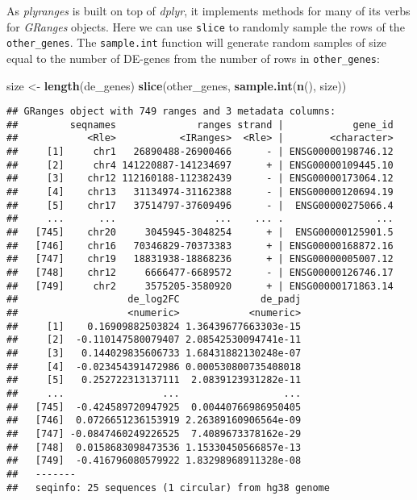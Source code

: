 \documentclass[
]{article}
\newenvironment{Shaded}{}{}
\newcommand{\KeywordTok}[1]{\textcolor[rgb]{0.00,0.44,0.13}{\textbf{#1}}}
\newcommand{\NormalTok}[1]{#1}
\newcommand{\StringTok}[1]{\textcolor[rgb]{0.25,0.44,0.63}{#1}}
\begin{document}
As \emph{plyranges} is built on top of \emph{dplyr}, it implements methods for many of
its verbs for \emph{GRanges} objects. Here we can use \texttt{slice} to randomly sample the
rows of the \texttt{other\_genes}. The \texttt{sample.int} function will generate random
samples of size equal to the number of DE-genes from the number of rows in
\texttt{other\_genes}:

\begin{Shaded}
\begin{Highlighting}[]
\NormalTok{size <-}\StringTok{ }\KeywordTok{length}\NormalTok{(de_genes)}
\KeywordTok{slice}\NormalTok{(other_genes, }\KeywordTok{sample.int}\NormalTok{(}\KeywordTok{n}\NormalTok{(), size))}
\end{Highlighting}
\end{Shaded}

\begin{verbatim}
## GRanges object with 749 ranges and 3 metadata columns:
##         seqnames              ranges strand |            gene_id
##            <Rle>           <IRanges>  <Rle> |        <character>
##     [1]     chr1   26890488-26900466      - | ENSG00000198746.12
##     [2]     chr4 141220887-141234697      + | ENSG00000109445.10
##     [3]    chr12 112160188-112382439      - | ENSG00000173064.12
##     [4]    chr13   31134974-31162388      - | ENSG00000120694.19
##     [5]    chr17   37514797-37609496      - |  ENSG00000275066.4
##     ...      ...                 ...    ... .                ...
##   [745]    chr20     3045945-3048254      + |  ENSG00000125901.5
##   [746]    chr16   70346829-70373383      + | ENSG00000168872.16
##   [747]    chr19   18831938-18868236      + | ENSG00000005007.12
##   [748]    chr12     6666477-6689572      - | ENSG00000126746.17
##   [749]     chr2     3575205-3580920      + | ENSG00000171863.14
##                   de_log2FC              de_padj
##                   <numeric>            <numeric>
##     [1]    0.16909882503824 1.36439677663303e-15
##     [2]  -0.110147580079407 2.08542530094741e-11
##     [3]   0.144029835606733 1.68431882130248e-07
##     [4]  -0.023454391472986 0.000530800735408018
##     [5]   0.252722313137111  2.0839123931282e-11
##     ...                 ...                  ...
##   [745]  -0.424589720947925  0.00440766986950405
##   [746]  0.0726651236153919 2.26389160906564e-09
##   [747] -0.0847460249226525  7.4089673378162e-29
##   [748]  0.0158683098473536 1.15330450566857e-13
##   [749]  -0.416796080579922 1.83298968911328e-08
##   -------
##   seqinfo: 25 sequences (1 circular) from hg38 genome
\end{verbatim}
\end{document}
